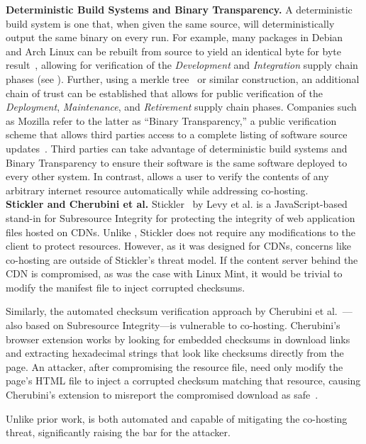 \noindent\textbf{Deterministic Build Systems and Binary Transparency.} A
deterministic build system is one that, when given the same source, will
deterministically output the same binary on every run. For example, many
packages in Debian~\cite{ReproBuildsDebian} and Arch Linux can be rebuilt from
source to yield an identical byte for byte result~\cite{ReproBuilds}, allowing
for verification of the \emph{Development} and \emph{Integration} supply chain
phases (see ). Further, using a merkle tree~\cite{MerkleTree} or
similar construction, an additional chain of trust can be established that
allows for public verification of the \emph{Deployment}, \emph{Maintenance}, and
\emph{Retirement} supply chain phases. Companies such as Mozilla refer to the
latter as ``Binary Transparency,'' a public verification scheme that allows
third parties access to a complete listing of software source
updates~\cite{BinaryTransparency}. Third parties can take advantage of
deterministic build systems and Binary Transparency to ensure their software is
the same software deployed to every other system. In contrast, \SYSTEM{} allows
a user to verify the contents of any arbitrary internet resource automatically
while addressing co-hosting. \\

\noindent\textbf{Stickler and Cherubini et al.} Stickler~\cite{Stickler} by Levy
et al. is a JavaScript-based stand-in for Subresource Integrity for protecting
the integrity of web application files hosted on CDNs. Unlike \SYSTEM{},
Stickler does not require any modifications to the client to protect resources.
However, as it was designed for CDNs, concerns like co-hosting are outside of
Stickler's threat model. If the content server behind the CDN is compromised, as
was the case with Linux Mint, it would be trivial to modify the manifest file to
inject corrupted checksums.

Similarly, the automated checksum verification approach by Cherubini et
al.~\cite{Cherubini}---also based on Subresource Integrity---is vulnerable to
co-hosting. Cherubini's browser extension works by looking for embedded
checksums in download links and extracting hexadecimal strings that look like
checksums directly from the page. An attacker, after compromising the resource
file, need only modify the page's HTML file to inject a corrupted checksum
matching that resource, causing Cherubini's extension to misreport the
compromised download as safe~\cite{Cherubini}.

Unlike prior work, \SYSTEM{} is both automated and capable of mitigating the
co-hosting threat, significantly raising the bar for the attacker.
